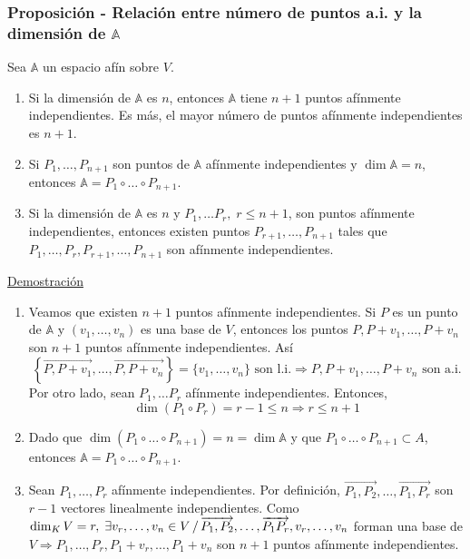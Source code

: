 \documentclass[12pt, a4paper, ones, notitlepage, openany,titlepage]{article}
\newcommand{\demostracion}{\noindent\underline{Demostración}}
\begin{document}
\subsubsection{Proposición - Relación entre número de puntos a.i. y la dimensión de $\mathbb{A}$}
\noindent Sea $\mathbb{A}$ un espacio afín sobre $V$.
\begin{enumerate}[label=(\arabic*)]
\item Si la dimensión de $\mathbb{A}$ es $n$, entonces $\mathbb{A}$ tiene $n+1$ puntos afínmente independientes. Es más, el mayor número de puntos afínmente independientes es $n+1$.

\item Si $P_{1}, \ldots, P_{n+1}$ son puntos de $\mathbb{A}$ afínmente independientes y $\dim  \mathbb{A}=n$, entonces $\mathbb{A}=P_{1} \circ \ldots \circ P_{n+1}$.

\item Si la dimensión de $\mathbb{A}$ es $n$ y $P_{1}, \ldots P_{r}, \; r \leq n+1$, son puntos afínmente independientes, entonces existen puntos $P_{r+1}, \ldots, P_{n+1}$ tales que $P_{1}, \ldots, P_r, P_{r+1}, \ldots, P_{n+1}$ son afínmente independientes.
\end{enumerate}
\demostracion
\begin{enumerate}[label=(\arabic*)]
\item Veamos que existen $n+1$ puntos afínmente independientes. Si $P$ es un punto de $\mathbb{A}$ y $\left(v_{1}, \ldots, v_{n}\right)$ es una base de $V$, entonces los puntos $P, P+v_{1}, \ldots, P+v_{n}$ son $n+1$ puntos afínmente independientes. Así
$$
\left\{\overrightarrow{P, P + v_1}, \ldots, \overrightarrow{P, P + v_n}\right\} = \{v_1, \ldots, v_n\} \text{ son l.i.} \Longrightarrow P, P + v_1, \ldots, P + v_n \text{ son a.i.}
$$
Por otro lado, sean $P_1, \ldots P_r$ afínmente independientes. Entonces,
$$
\dim(P_1 \circ P_r) = r - 1 \le n \Longrightarrow r \le n + 1
$$

\item Dado que $\dim \left(P_{1} \circ \ldots \circ P_{n+1}\right)=n = \dim \mathbb{A}$ y que $P_1 \circ \ldots \circ P_{n + 1} \subset A$, entonces $\mathbb{A}=P_{1} \circ \ldots \circ P_{n+1}$.

\item Sean $P_1, \ldots, P_r$ afínmente independientes. Por definición, $\overrightarrow{P_1,P_2}, \ldots, \overrightarrow{P_1,P_r}$ son $r - 1$ vectores linealmente independientes. Como $\dim_K V = r, \; \exists v_r, \ldots, v_n \in V \,/\, \overrightarrow{P_1, P_2}, \ldots, \overrightarrow{P_1 P_r}, \\ v_r, \ldots, v_n$ forman una base de $V \Longrightarrow P_1, \ldots, P_r, P_1 + v_r, \ldots, P_1 + v_n$ son $n + 1$ puntos afínmente independientes.
\end{enumerate}
\end{document}
